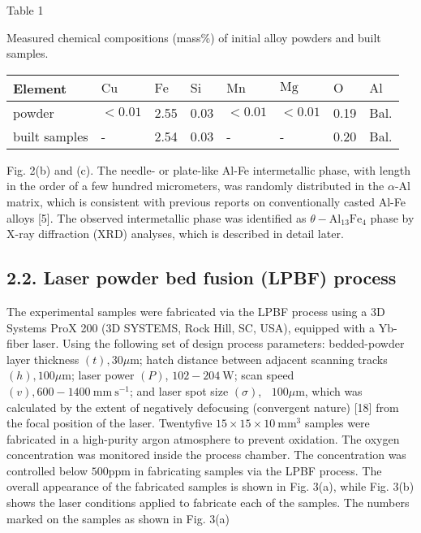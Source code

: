 \documentclass[10pt]{article}
\begin{document}
Table 1

Measured chemical compositions (mass\%) of initial alloy powders and built samples.

\begin{center}
\begin{tabular}{llllllll}
\hline
Element & $\mathrm{Cu}$ & $\mathrm{Fe}$ & $\mathrm{Si}$ & $\mathrm{Mn}$ & $\mathrm{Mg}$ & $\mathrm{O}$ & $\mathrm{Al}$ \\
\hline
powder & $<0.01$ & 2.55 & 0.03 & $<0.01$ & $<0.01$ & 0.19 & Bal. \\
built samples & - & 2.54 & 0.03 & - & - & 0.20 & Bal. \\
\hline
\end{tabular}
\end{center}

Fig. 2(b) and (c). The needle- or plate-like Al-Fe intermetallic phase, with length in the order of a few hundred micrometers, was randomly distributed in the $\alpha$-Al matrix, which is consistent with previous reports on conventionally casted Al-Fe alloys [5]. The observed intermetallic phase was identified as $\theta-\mathrm{Al}_{13} \mathrm{Fe}_{4}$ phase by $\mathrm{X}$-ray diffraction (XRD) analyses, which is described in detail later.

\subsection*{2.2. Laser powder bed fusion (LPBF) process}
The experimental samples were fabricated via the LPBF process using a 3D Systems ProX 200 (3D SYSTEMS, Rock Hill, SC, USA), equipped with a $\mathrm{Yb}$-fiber laser. Using the following set of design process parameters: bedded-powder layer thickness $(t), 30 \mu \mathrm{m}$; hatch distance between adjacent scanning tracks $(h), 100 \mu \mathrm{m}$; laser power $(P)$, $102-204 \mathrm{~W}$; scan speed $(v), 600-1400 \mathrm{~mm} \mathrm{~s}^{-1}$; and laser spot size $(\sigma)$, $~$ $100 \mu \mathrm{m}$, which was calculated by the extent of negatively defocusing (convergent nature) [18] from the focal position of the laser. Twentyfive $15 \times 15 \times 10 \mathrm{~mm}^{3}$ samples were fabricated in a high-purity argon atmosphere to prevent oxidation. The oxygen concentration was monitored inside the process chamber. The concentration was controlled below $500 \mathrm{ppm}$ in fabricating samples via the LPBF process. The overall appearance of the fabricated samples is shown in Fig. 3(a), while Fig. 3(b) shows the laser conditions applied to fabricate each of the samples. The numbers marked on the samples as shown in Fig. 3(a)
\end{document}
